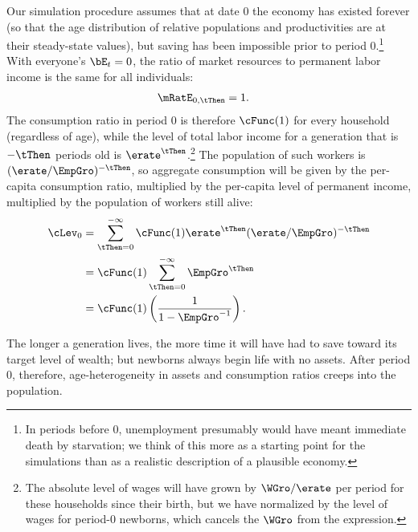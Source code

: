 \documentclass{\handout}
\begin{document}
Our simulation procedure assumes that at date 0 the economy has existed forever (so 
that the age distribution of relative populations and productivities are at their steady-state values), but saving has been impossible prior to
period 0.\footnote{In periods before 0, unemployment presumably would have 
meant immediate death by starvation; we think of this more as a starting point
for the simulations than as a realistic description of a plausible economy.}
With everyone's $\bE_{t}=0$, the ratio of market resources to permanent
labor income is the same for all individuals:
\begin{equation}\begin{gathered}\begin{aligned}
  \mRatE_{0,\tThen} & =  1
.
\end{aligned}\end{gathered}\end{equation}
The consumption ratio in period 0 is therefore $\cFunc(1)$ for every
household (regardless of age), while the
level of total labor income for a generation that is $-\tThen$ periods old is $\erate^{\tThen}$.\footnote{The absolute level of wages will have
grown by $\WGro/\erate$ per period for these households since their birth, but we have normalized by the level of wages
for period-0 newborns, which cancels the $\WGro$ from the expression.}  The population of
such workers is $(\erate/\EmpGro)^{-\tThen}$, so aggregate consumption will
be given by the per-capita consumption ratio, multiplied by the
per-capita level of permanent income, multiplied by the population of
workers still alive:
\begin{equation}\begin{gathered}\begin{aligned}
  \cLev_{0} & =  \sum_{\tThen=0}^{-\infty} \cFunc(1) \erate^{\tThen} (\erate/\EmpGro)^{-\tThen}
\\ & =  \cFunc(1) \sum_{\tThen=0}^{-\infty}  \EmpGro^{\tThen}
\\ & =  \cFunc(1) \left(\frac{1}{1-\EmpGro^{-1}}\right)
.
\end{aligned}\end{gathered}\end{equation}

The longer a generation lives, the more time it will have had to save toward
its target level of wealth; but newborns always begin life with no assets.  After period 0, therefore, age-heterogeneity in assets and consumption ratios creeps into the population.
\end{document}

